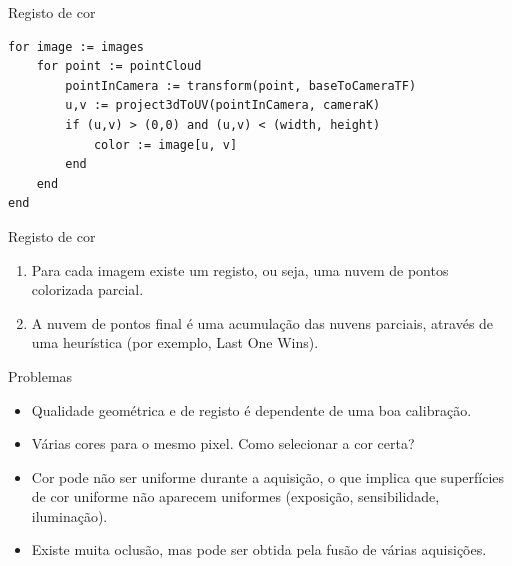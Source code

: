 \begin{frame}[fragile]{Registo de cor}

    \begin{verbatim}
for image := images
    for point := pointCloud
        pointInCamera := transform(point, baseToCameraTF)
        u,v := project3dToUV(pointInCamera, cameraK)
        if (u,v) > (0,0) and (u,v) < (width, height)
            color := image[u, v]
        end
    end
end
    \end{verbatim}

\end{frame}

\begin{frame}{Registo de cor}

    \begin{enumerate}
        \item Para cada imagem existe um registo, ou seja, uma nuvem de pontos colorizada parcial.
        \item A nuvem de pontos final é uma acumulação das nuvens parciais, através de uma heurística (por exemplo, Last One Wins).
    \end{enumerate}
    
\end{frame}

\begin{frame}{Problemas}

    \begin{itemize}
        \item Qualidade geométrica e de registo é dependente de uma boa calibração.
        \item Várias cores para o mesmo pixel. Como selecionar a cor certa?
        \item Cor pode não ser uniforme durante a aquisição, o que implica que superfícies de cor uniforme não aparecem uniformes (exposição, sensibilidade, iluminação).
        \item Existe muita oclusão, mas pode ser obtida pela fusão de várias aquisições.
    \end{itemize}

\end{frame}

